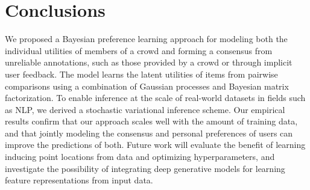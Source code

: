 \section{Conclusions}

We proposed a Bayesian preference learning approach 
for modeling both the individual utilities of members of a crowd 
and forming a consensus from 
unreliable annotations, such as those provided by a crowd or through implicit user feedback.
The model learns the latent utilities of items from pairwise comparisons using a combination of Gaussian processes and Bayesian matrix factorization.
To enable inference at the scale of real-world datasets in fields such as NLP,
we derived a stochastic variational inference scheme.
Our empirical results confirm that our approach scales well with the amount of training data,
and that jointly modeling the consensus and personal preferences of users can improve the predictions
of both.
Future work will evaluate the benefit of learning inducing point locations from data and
optimizing hyperparameters,
and investigate the possibility of integrating deep generative models 
for learning feature representations from input data.
